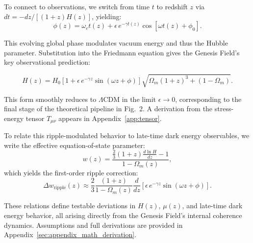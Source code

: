 To connect to observations, we switch from time \( t \) to redshift \( z \) via \( dt = -dz/[(1+z)H(z)] \), yielding:
\begin{equation}
\phi(z) = \omega_c t(z) + \epsilon\, e^{-\gamma t(z)}\cos[\omega t(z) + \phi_0].
\label{eq:phi_redshift}
\end{equation}

This evolving global phase modulates vacuum energy and thus the Hubble parameter. Substitution into the Friedmann equation gives the Genesis Field’s key observational prediction:

\begin{tcolorbox}[colback=gray!7, colframe=black, title=Genesis Field Prediction for $H(z)$]
\begin{equation}
H(z) = H_0\left[1 + \epsilon\, e^{-\gamma z}\sin(\omega z + \phi)\right]\sqrt{\Omega_m(1+z)^3 + (1-\Omega_m)}.
\label{eq:Hubble_ripple}
\end{equation}
\end{tcolorbox}

This form smoothly reduces to \(\Lambda\)CDM in the limit \( \epsilon \to 0 \), corresponding to the final stage of the theoretical pipeline in Fig.~2. A derivation from the stress-energy tensor \( T_{\mu\nu} \) appears in Appendix~\ref{app:tensor}.

To relate this ripple-modulated behavior to late-time dark energy observables, we write the effective equation-of-state parameter:
\begin{equation}
w(z) = \frac{\frac{2}{3}(1+z)\frac{d\ln H}{dz} - 1}{1 - \Omega_m(z)},
\label{eq:w_z}
\end{equation}
which yields the first-order ripple correction:
\begin{equation}
\Delta w_{\text{ripple}}(z) \approx \frac{2}{3} \frac{(1+z)}{1 - \Omega_m(z)} \frac{d}{dz} \left[\epsilon\, e^{-\gamma z}\sin(\omega z + \phi)\right].
\label{eq:delta_w}
\end{equation}

These relations define testable deviations in \( H(z) \), \( \mu(z) \), and late-time dark energy behavior, all arising directly from the Genesis Field’s internal coherence dynamics. Assumptions and full derivations are provided in Appendix~\ref{sec:appendix_math_derivation}.

